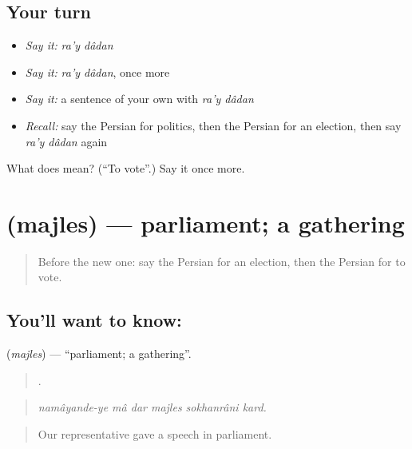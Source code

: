 \subsection*{Your turn}
\begin{itemize}
\raggedright
  \item \emph{Say it:} \emph{ra'y dâdan}
  \item \emph{Say it:} \emph{ra'y dâdan}, once more
  \item \emph{Say it:} a sentence of your own with \emph{ra'y dâdan}
  \item \emph{Recall:} say the Persian for politics, then the Persian for an election, then say \emph{ra'y dâdan} again
\end{itemize}

\begin{tcolorbox}[breakable,colback=teal!4,colframe=teal!35!black,title={Before you move on}]
What does   mean? (\textquotedblleft{}To vote\textquotedblright{}.) Say it once more.
\end{tcolorbox}
\section[\texorpdfstring{\fa{مجلس} (majles)}{مجلس (majles)}]{ (majles) — parliament; a gathering}

\label{lesson:FA-C409-majles}



\begin{quote}
Before the new one: say the Persian for an election, then the Persian for to vote.
\end{quote}

\subsection*{You'll want to know: }
\textbf{} (\emph{majles}) — \textquotedblleft{}parliament; a gathering\textquotedblright{}.

\begin{quote}
     .
\end{quote}

\begin{quote}
\emph{namâyande-ye mâ dar majles sokhanrâni kard.}
\end{quote}

\begin{quote}
Our representative gave a speech in parliament.
\end{quote}

